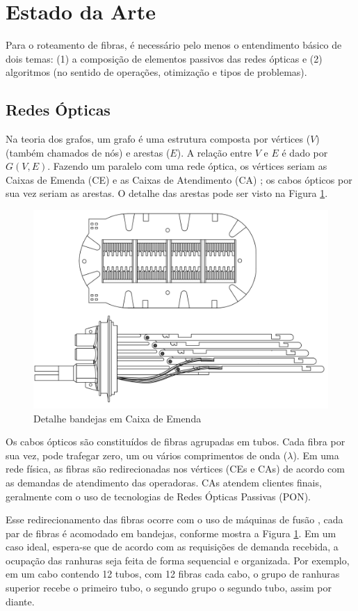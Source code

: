 \section{Estado da Arte} \label{sec:fundaments}

Para o roteamento de fibras, é necessário pelo menos o entendimento básico de
dois temas: (1) a composição de elementos passivos das redes ópticas e (2)
algoritmos (no sentido de operações, otimização e tipos de problemas).

\subsection{Redes Ópticas}

Na teoria dos grafos, um grafo é uma estrutura composta por vértices ($V$)
(também chamados de nós) e arestas ($E$). A relação entre $V$ e $E$ é dado por
$G(V,E)$. Fazendo um paralelo com uma rede óptica, os vértices seriam as Caixas
de Emenda (CE) e as Caixas de Atendimento (CA) \cite{maeda2009optical}; os
cabos ópticos por sua vez seriam as arestas. O detalhe das arestas pode ser
visto na Figura \ref{fig:ce_detalhe_bandejas}.

\begin{figure}[ht]
  \centering
	\includegraphics[width=.5\textwidth]{./images/caixa_emenda_detalhe_bandejas.png}
	\caption{Detalhe bandejas em Caixa de Emenda}
	\label{fig:ce_detalhe_bandejas}
\end{figure}

Os cabos ópticos são constituídos de fibras agrupadas em tubos. Cada fibra por
sua vez, pode trafegar zero, um ou vários comprimentos de onda ($\lambda$).
Em uma rede física, as fibras são redirecionadas nos vértices (CEs e CAs) de
acordo com as demandas de atendimento das operadoras. CAs atendem clientes finais,
geralmente com o uso de tecnologias de Redes Ópticas Passivas (PON).

Esse redirecionamento das fibras ocorre com o uso de máquinas de fusão
\cite{maeda2009optical}, cada par de fibras é acomodado em bandejas, conforme
mostra a Figura \ref{fig:ce_detalhe_bandejas}. Em um caso ideal, espera-se que
de acordo com as requisições de demanda recebida, a ocupação das ranhuras seja
feita de forma sequencial e organizada. Por exemplo, em um cabo contendo 12
tubos, com 12 fibras cada cabo, o grupo de ranhuras superior recebe o primeiro
tubo, o segundo grupo o segundo tubo, assim por diante.

